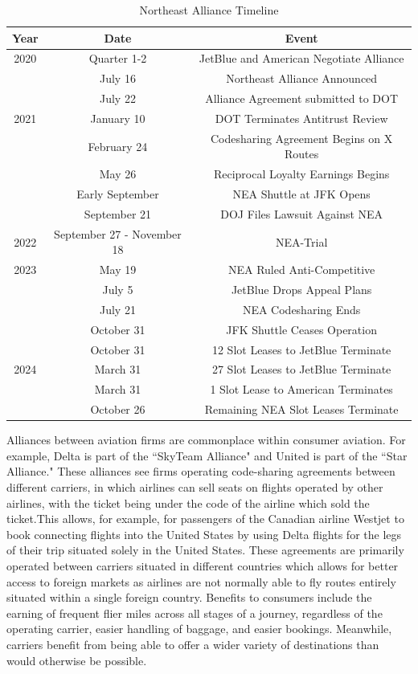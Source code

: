 \documentclass{article}
\begin{document}
    \begin{table}[tb]
		\caption{Northeast Alliance Timeline}
		\label{tab:NEA_Timeline}
		\begin{center}
			\begin{tabular}{ccc}
				\hline
				Year & Date & Event \\
				\hline
				2020 & Quarter 1-2 & JetBlue and American Negotiate Alliance \\ 
				& July 16 & Northeast Alliance Announced \\
				& July 22 & Alliance Agreement submitted to DOT \\
				\hline 
				2021 & January 10 & DOT Terminates Antitrust Review \\
				& February 24 & Codesharing Agreement Begins on {X} Routes \\
				& May 26 & Reciprocal Loyalty Earnings Begins \\
				& Early September & NEA Shuttle at JFK Opens \\
				& September 21 & DOJ Files Lawsuit Against NEA \\  
				\hline
				2022 & September 27 - November 18 & NEA-Trial \\
				\hline 
				2023 & May 19 & NEA Ruled Anti-Competitive \\
				& July 5 & JetBlue Drops Appeal Plans \\
				& July 21 & NEA Codesharing Ends \\
				& October 31 & JFK Shuttle Ceases Operation\\
				& October 31 & 12 Slot Leases to JetBlue Terminate \\
				\hline 
				2024 &  March 31  & 27 Slot Leases to JetBlue Terminate \\ 
				& March 31 & 1 Slot Lease to American Terminates \\
				& October 26 & Remaining NEA Slot Leases Terminate				 \end{tabular}
		\end{center}
	\end{table}

	Alliances between aviation firms are commonplace within consumer aviation. For example, Delta is part of the ``SkyTeam Alliance" and United is part of the ``Star Alliance." These alliances see firms operating code-sharing agreements between different carriers, in which airlines can sell seats on flights operated by other airlines, with the ticket being under the code of the airline which sold the ticket.This allows, for example, for passengers of the Canadian airline Westjet to book connecting flights into the United States by using Delta flights for the  legs of their trip situated solely in the United States. These agreements are primarily operated between carriers situated in different countries which allows for better access to foreign markets as airlines are not normally able to fly routes entirely situated within a single foreign country. Benefits to consumers include the earning of frequent flier miles across all stages of a journey, regardless of the operating carrier, easier handling of baggage, and easier bookings. Meanwhile, carriers benefit from being able to offer a wider variety of destinations than would otherwise be possible.
	
\end{document}
